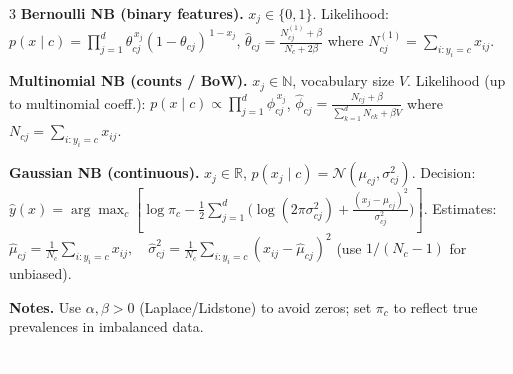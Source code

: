\documentclass[10pt,landscape]{article}
\begin{document}
\begin{multicols}{3}
        \textbf{Bernoulli NB (binary features).} $x_j\in\{0,1\}$. \;
        Likelihood: $\displaystyle p(x\mid c)=\prod_{j=1}^d \theta_{cj}^{\,x_j}(1-\theta_{cj})^{\,1-x_j}$,\;
    $\displaystyle \hat\theta_{cj}=\frac{N^{(1)}_{cj}+\beta}{N_c+2\beta}$ where $N^{(1)}_{cj}=\sum_{i:y_i=c} x_{ij}$.
        \vspace{.2em}

        \textbf{Multinomial NB (counts / BoW).} $x_j\in\mathbb{N}$, vocabulary size $V$. \;
        Likelihood (up to multinomial coeff.): $\displaystyle p(x\mid c)\propto\prod_{j=1}^d \phi_{cj}^{\,x_j}$,\;
    $\displaystyle \hat\phi_{cj}=\frac{N_{cj}+\beta}{\sum_{k=1}^d N_{ck}+\beta V}$ where $N_{cj}=\sum_{i:y_i=c} x_{ij}$.
        \vspace{.2em}

        \textbf{Gaussian NB (continuous).} $x_j\in\mathbb{R}$, $p(x_j\mid c)=\mathcal{N}(\mu_{cj},\sigma^2_{cj})$. \;
        Decision: $\displaystyle \hat y(x)=\arg\max_c\left[\log\pi_c-\tfrac12\sum_{j=1}^d\Big(\log(2\pi\sigma^2_{cj})+\tfrac{(x_j-\mu_{cj})^2}{\sigma^2_{cj}}\Big)\right]$. \;
        Estimates: $\displaystyle \hat\mu_{cj}=\frac{1}{N_c}\!\sum_{i:y_i=c}\!x_{ij},\quad
    \hat\sigma^2_{cj}=\frac{1}{N_c}\!\sum_{i:y_i=c}\!(x_{ij}-\hat\mu_{cj})^2$ (use $1/(N_c\!-\!1)$ for unbiased).
        \vspace{.2em}

        \textbf{Notes.} Use $\alpha,\beta>0$ (Laplace/Lidstone) to avoid zeros; set $\pi_c$ to reflect true prevalences in imbalanced data.

        \textcolor{white}{.}\vspace{-5mm}\\ %

\end{multicols}
\end{document}
